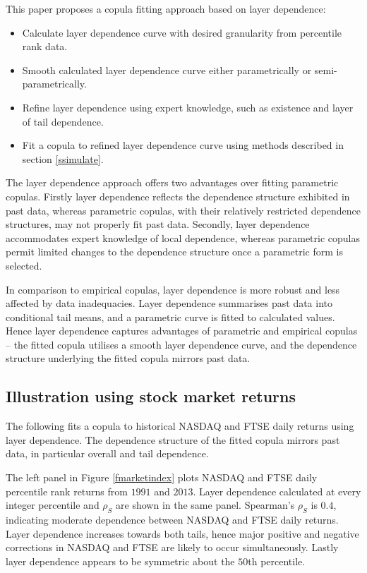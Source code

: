 \documentclass[authoryear]{elsarticle}
\newcommand{\fref}[1]{Figure \ref{#1}}
\newcommand{\aref}[1]{\ref{#1}}
\begin{document}
This paper proposes a copula fitting approach based on layer dependence:
\begin{itemize}
\item Calculate layer dependence curve with desired granularity from percentile rank data.

\item Smooth calculated layer dependence curve either parametrically or semi-parametrically.

\item Refine layer dependence using expert knowledge, such as existence and layer of tail dependence.

\item Fit a copula to refined layer dependence curve using methods described in section \aref{ssimulate}.
\end{itemize}
The layer dependence approach offers two advantages over fitting parametric copulas. Firstly layer dependence reflects the dependence structure exhibited in past data, whereas parametric copulas, with their relatively restricted dependence structures, may not properly fit past data. Secondly, layer dependence accommodates expert knowledge of local dependence, whereas parametric copulas permit limited changes to the dependence structure once a parametric form is selected.


In comparison to empirical copulas, layer dependence is more robust and less affected by data inadequacies. Layer dependence summarises past data into conditional tail means, and a parametric curve is fitted to calculated values. Hence layer dependence captures advantages of parametric and empirical copulas -- the fitted copula utilises a smooth layer dependence curve, and the dependence structure underlying the fitted copula mirrors past data.



\subsection{Illustration using stock market returns}


The following fits a copula to historical NASDAQ and FTSE daily returns using layer dependence. The dependence structure of the fitted copula mirrors past data, in particular overall and tail dependence.

The left panel in \fref{fmarketindex} plots NASDAQ and FTSE daily percentile rank returns from $1991$ and $2013$. Layer dependence calculated at every integer percentile and  $\rho_S$ are shown in the same panel. Spearman's $\rho_S$ is $0.4$, indicating moderate dependence between NASDAQ and FTSE daily returns. Layer dependence increases towards both tails, hence major positive and negative corrections in NASDAQ and FTSE are likely to occur simultaneously. Lastly layer dependence appears to be symmetric about the $50$th percentile.
\end{document}
